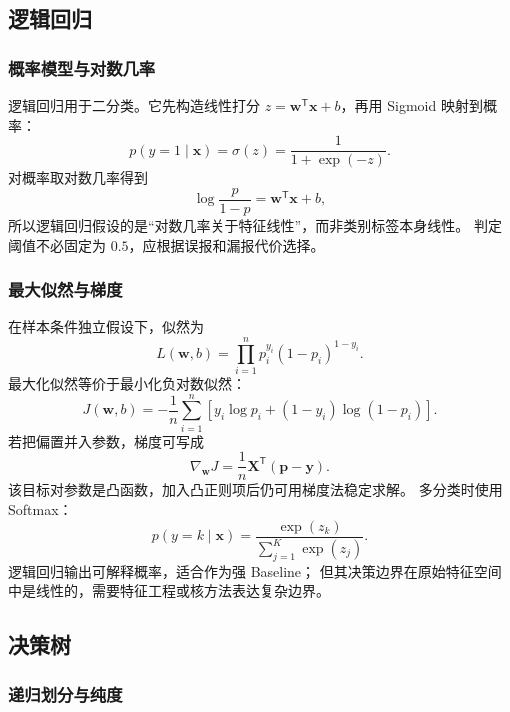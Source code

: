 \documentclass[UTF8,zihao=-4,a4paper,fontset=windows]{ctexart}
\begin{document}
\subsection{逻辑回归}

\subsubsection{概率模型与对数几率}

逻辑回归用于二分类。它先构造线性打分
$z=\bm{w}^{\mathsf T}\bm{x}+b$，再用 Sigmoid 映射到概率：
\begin{equation}
  p(y=1\mid\bm{x})
  =\sigma(z)=\frac{1}{1+\exp(-z)}.
\end{equation}
对概率取对数几率得到
\begin{equation}
  \log\frac{p}{1-p}
  =\bm{w}^{\mathsf T}\bm{x}+b,
\end{equation}
所以逻辑回归假设的是“对数几率关于特征线性”，而非类别标签本身线性。
判定阈值不必固定为 $0.5$，应根据误报和漏报代价选择。

\subsubsection{最大似然与梯度}

在样本条件独立假设下，似然为
\begin{equation}
  L(\bm{w},b)
  =\prod_{i=1}^{n}
  p_i^{y_i}(1-p_i)^{1-y_i}.
\end{equation}
最大化似然等价于最小化负对数似然：
\begin{equation}
  J(\bm{w},b)
  =-\frac{1}{n}\sum_{i=1}^{n}
  \left[y_i\log p_i+(1-y_i)\log(1-p_i)\right].
\end{equation}
若把偏置并入参数，梯度可写成
\begin{equation}
  \nabla_{\bm{w}}J
  =\frac{1}{n}\bm{X}^{\mathsf T}
  (\bm{p}-\bm{y}).
\end{equation}
该目标对参数是凸函数，加入凸正则项后仍可用梯度法稳定求解。
多分类时使用 Softmax：
\begin{equation}
  p(y=k\mid\bm{x})
  =\frac{\exp(z_k)}{\sum_{j=1}^{K}\exp(z_j)}.
\end{equation}
逻辑回归输出可解释概率，适合作为强 Baseline；
但其决策边界在原始特征空间中是线性的，需要特征工程或核方法表达复杂边界。

\subsection{决策树}

\subsubsection{递归划分与纯度}
\end{document}
